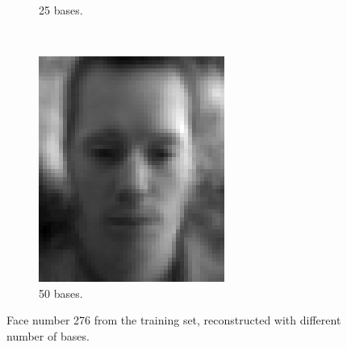 \documentclass[a4paper, 10pt, conference]{ieeeconf}
\begin{document}
\begin{figure}[!ht]
\begin{subfigure}{0.1\textwidth}
          \caption{25 bases.}
        \end{subfigure}
        ~
        \begin{subfigure}{0.1\textwidth}
          \includegraphics[width=\textwidth]{src/reface23.png}
          \caption{50 bases.}
        \end{subfigure}

	\caption{Face number 276 from the training set, reconstructed with different number of bases.}
  \label{fig:reconex2}
\end{figure}
\end{document}
